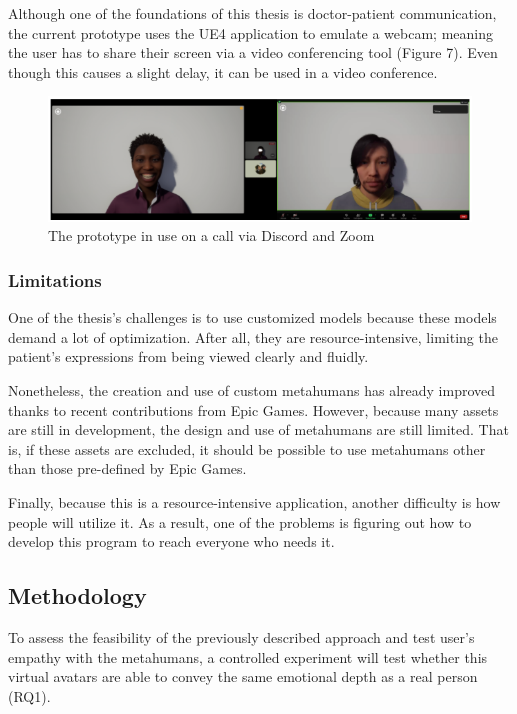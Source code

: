 Although one of the foundations of this thesis is doctor-patient communication, the current prototype uses the UE4 application to emulate a webcam; meaning the user has to share their screen via a video conferencing tool (Figure 7). Even though this causes a slight delay, it can be used in a video conference.

\begin{figure}[h!]
\includegraphics[width=\textwidth]{figures/zoomAndDiscord.PNG}
\centering
\caption{The prototype in use on a call via Discord and Zoom}
\end{figure}

\subsubsection{Limitations}
One of the thesis's challenges is to use customized models because these models demand a lot of optimization. After all, they are resource-intensive, limiting the patient's expressions from being viewed clearly and fluidly. 

Nonetheless, the creation and use of custom metahumans has already improved thanks to recent contributions from Epic Games. However, because many assets are still in development, the design and use of metahumans are still limited. That is, if these assets are excluded, it should be possible to use metahumans other than those pre-defined by Epic Games.

Finally, because this is a resource-intensive application, another difficulty is how people will utilize it. As a result, one of the problems is figuring out how to develop this program to reach everyone who needs it.

\subsection{Methodology}
To assess the feasibility of the previously described approach and test user's empathy with the metahumans, a controlled experiment will test whether this virtual avatars are able to convey the same emotional depth as a real person (RQ1).

